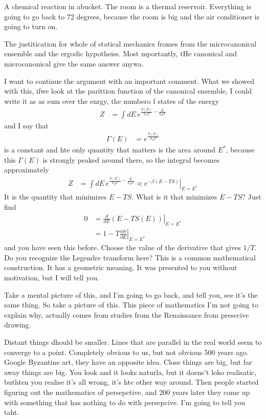 A chemical reaction in abucket.
The room is a thermal reservoir.
Everything is going to go back to 72 degrees,
because the room is big and the air conditioner is going to turn on.

The justitication for whole of statical mechanics fromes from the microcanonical
ensemble and the ergodic hypotheiss.
Most mportantly,
tHe canonical and microcanonical give the same answer anywa.

I want to continue the argument
with an important comment.
What we showed with  this,
ifwe look at the parittion function of the canonical ensemble,
I could write it as as sum over the enrgy,
the numbero f states of the energy
\begin{align}
    Z &=
    \int dE\,
    e^{\frac{S(E)}{k_B T} - \frac{E}{k_B T}}
\end{align}
and I say that
\begin{align}
    \Gamma(E) &= e^{\frac{S(E)}{k_B T}}
\end{align}
is a constant
and hte only quantity that matters is
the area around $E^*$,
because this $\Gamma(E)$ is strongly peaked around there,
so the integral becomes approximately
\begin{align}
    Z &=
    \int dE\,
    e^{\frac{S(E)}{k_B T} - \frac{E}{k_B T}}
    \approx
    \left. e^{-\beta\left( E - TS \right)}\right|_{E=E^*}
\end{align}
It is the quantity that minimizes $E-TS$.
What is it that minimizes $E-TS$?
Just find
\begin{align}
    0 &=
    \left.\frac{d}{dE}\left( E - TS(E) \right)\right|_{E=E^*}\\
    &=
    \left.
    1 - T \frac{\partial S}{\partial E} \right|_{E=E^*}
\end{align}
and you have seen this before.
Choose the value of the derivative that gives $1/T$.
Do you recognize the Legendre transform here?
This is a common mathematical construction.
It has a geometric meaning.
It was presented to you without motivation,
but I will tell you.

Take a mental picture of this,
and I'm going to go back,
and tell you,
see it's the same thing.
So take a picture of this.
This piece of mathematics
I'm not going to explain why,
actually comes from studies from the Renaissance
from presecive drawing.

Distant things dhould be smaller.
Lines that are parallel in the real world seem to converge to a point.
Completely obvious to us,
but not obvious 500 years ago.
Google Byzantine art,
they have an opposite idea.
Close things are big,
but far away things are big.
You look and it looks naturla,
but it doens't loko realisatic,
buthten you realise it's all wrong,
it's hte other way around.
Then people started figuring out the mathematics of persepctive,
and 200 years later they come up with something that has nothing to do with
persepcive.
I'm going to tell you taht.


